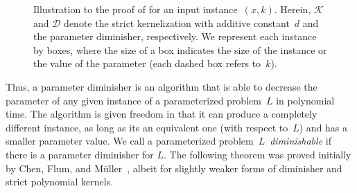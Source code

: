 \documentclass[11pt,a4,USenglish]{article}
\theoremstyle{definition}
\theoremstyle{plain}
\theoremstyle{remark}
\begin{document}
\begin{figure}
  \caption{Illustration to the proof of  for an input instance~$(x,k)$. Herein, $\mathcal{K}$ and $\mathcal{D}$ denote the strict kernelization with additive constant~$d$ and the parameter diminisher, respectively. We represent each instance by boxes, where the size of a box indicates the size of the instance or the value of the parameter (each dashed box refers to~$k$).}
  \label{fig:dim}
\end{figure}
%
Thus, a parameter diminisher is an algorithm that is able to decrease the parameter of any given instance of a parameterized problem~$L$ in polynomial time. 
\iflong{}The algorithm is given freedom in that it can produce a completely different instance, as long as its an equivalent one (with respect to~$L$) and has a smaller parameter value.\fi{}%
We call a parameterized problem~$L$~\emph{diminishable} if there is a parameter diminisher for $L$. 
The following theorem was proved initially by Chen, Flum, and M\"{u}ller~\cite{chen2011lower}, albeit for slightly weaker forms of diminisher and strict polynomial kernels.
\end{document}
